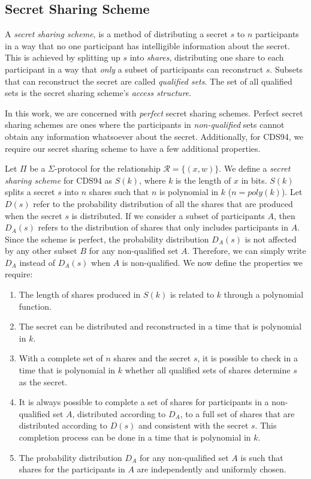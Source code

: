 \subsection{Secret Sharing Scheme}
A \textit{secret sharing scheme}, is a method of distributing a secret $s$ to $n$ participants in a way that no one participant has intelligible information about the secret. This is achieved by splitting up $s$ into \textit{shares}, distributing one share to each participant in a way that \textit{only} a subset of participants can reconstruct $s$. Subsets that can reconstruct the secret are called \textit{qualified sets}. The set of all qualified sets is the secret sharing scheme's \textit{access structure}.

In this work, we are concerned with \textit{perfect} secret sharing schemes. Perfect secret sharing schemes are ones where the participants in \textit{non-qualified} sets cannot obtain any information whatsoever about the secret. Additionally, for CDS94, we require our secret sharing scheme to have a few additional properties. 

\begin{definition}\label{def:secret-sharing}
Let $\Pi$ be a $\Sigma$-protocol for the relationship $\mathcal R = \{(x,w)\}$. We define a \textit{secret sharing scheme} for CDS94 as $S(k)$, where $k$ is the length of $x$ in bits. $S(k)$ splits a secret $s$ into $n$ shares such that $n$ is polynomial in $k$ ($n = poly(k)$). Let $D(s)$ refer to the probability distribution of all the shares that are produced when the secret $s$ is distributed. If we consider a subset of participants $A$, then $D_A(s)$ refers to the distribution of shares that only includes participants in $A$. Since the scheme is perfect, the probability distribution $D_A(s)$ is not affected by any other subset $B$ for any non-qualified set $A$. Therefore, we can simply write $D_A$ instead of $D_A(s)$ when $A$ is non-qualified. We now define the properties we require:
    \begin{enumerate}
        \item The length of shares produced in $S(k)$ is related to $k$ through a polynomial function.
        \item The secret can be distributed and reconstructed in a time that is polynomial in $k$.
        \item With a complete set of $n$ shares and the secret $s$, it is possible to check in a time that is polynomial in $k$ whether all qualified sets of shares determine $s$ as the secret.
        \item It is always possible to complete a set of shares for participants in a non-qualified set $A$, distributed according to $D_A$, to a full set of shares that are distributed according to $D(s)$ and consistent with the secret $s$. This completion process can be done in a time that is polynomial in $k$.
        \item The probability distribution $D_A$ for any non-qualified set $A$ is such that shares for the participants in $A$ are independently and uniformly chosen.
    \end{enumerate}
\end{definition}

